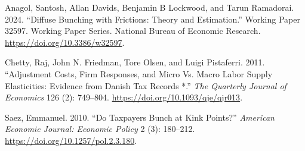 \documentclass[
  letterpaper,
  DIV=11,
  numbers=noendperiod]{scrartcl}
\newlength{\cslhangindent}
\newenvironment{CSLReferences}[2] %
 {\begin{list}{}{%
  \setlength{\itemindent}{0pt}
  \setlength{\leftmargin}{0pt}
  \setlength{\parsep}{0pt}
  \ifodd #1
   \setlength{\leftmargin}{\cslhangindent}
   \setlength{\itemindent}{-1\cslhangindent}
  \fi
  \setlength{\itemsep}{#2\baselineskip}}}
 {\end{list}}
\begin{document}
\label{refs}
\begin{CSLReferences}{1}{0}
Anagol, Santosh, Allan Davids, Benjamin B Lockwood, and Tarun Ramadorai.
2024. {``Diffuse Bunching with Frictions: Theory and Estimation.''}
Working Paper 32597. Working Paper Series. National Bureau of Economic
Research. \url{https://doi.org/10.3386/w32597}.

Chetty, Raj, John N. Friedman, Tore Olsen, and Luigi Pistaferri. 2011.
{``Adjustment Costs, Firm Responses, and Micro Vs. Macro Labor Supply
Elasticities: Evidence from Danish Tax Records *.''} \emph{The Quarterly
Journal of Economics} 126 (2): 749--804.
\url{https://doi.org/10.1093/qje/qjr013}.

Saez, Emmanuel. 2010. {``Do Taxpayers Bunch at Kink Points?''}
\emph{American Economic Journal: Economic Policy} 2 (3): 180--212.
\url{https://doi.org/10.1257/pol.2.3.180}.

\end{CSLReferences}
\end{document}
